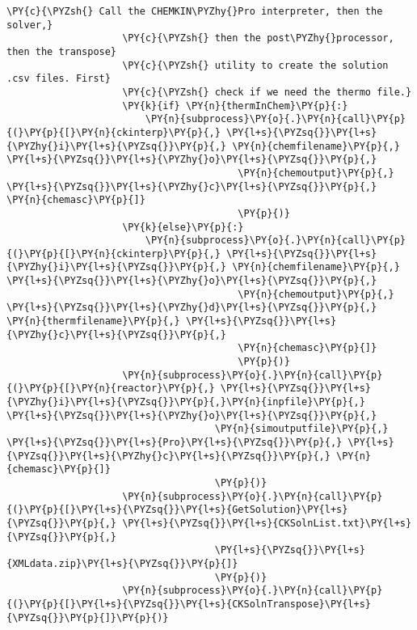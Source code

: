 \begin{Verbatim}[commandchars=\\\{\}]
                    \PY{c}{\PYZsh{} Call the CHEMKIN\PYZhy{}Pro interpreter, then the solver,}
                    \PY{c}{\PYZsh{} then the post\PYZhy{}processor, then the transpose}
                    \PY{c}{\PYZsh{} utility to create the solution .csv files. First}
                    \PY{c}{\PYZsh{} check if we need the thermo file.}
                    \PY{k}{if} \PY{n}{thermInChem}\PY{p}{:}
                        \PY{n}{subprocess}\PY{o}{.}\PY{n}{call}\PY{p}{(}\PY{p}{[}\PY{n}{ckinterp}\PY{p}{,} \PY{l+s}{\PYZsq{}}\PY{l+s}{\PYZhy{}i}\PY{l+s}{\PYZsq{}}\PY{p}{,} \PY{n}{chemfilename}\PY{p}{,} \PY{l+s}{\PYZsq{}}\PY{l+s}{\PYZhy{}o}\PY{l+s}{\PYZsq{}}\PY{p}{,}
                                        \PY{n}{chemoutput}\PY{p}{,} \PY{l+s}{\PYZsq{}}\PY{l+s}{\PYZhy{}c}\PY{l+s}{\PYZsq{}}\PY{p}{,} \PY{n}{chemasc}\PY{p}{]}
                                        \PY{p}{)}
                    \PY{k}{else}\PY{p}{:}
                        \PY{n}{subprocess}\PY{o}{.}\PY{n}{call}\PY{p}{(}\PY{p}{[}\PY{n}{ckinterp}\PY{p}{,} \PY{l+s}{\PYZsq{}}\PY{l+s}{\PYZhy{}i}\PY{l+s}{\PYZsq{}}\PY{p}{,} \PY{n}{chemfilename}\PY{p}{,} \PY{l+s}{\PYZsq{}}\PY{l+s}{\PYZhy{}o}\PY{l+s}{\PYZsq{}}\PY{p}{,}
                                        \PY{n}{chemoutput}\PY{p}{,} \PY{l+s}{\PYZsq{}}\PY{l+s}{\PYZhy{}d}\PY{l+s}{\PYZsq{}}\PY{p}{,} \PY{n}{thermfilename}\PY{p}{,} \PY{l+s}{\PYZsq{}}\PY{l+s}{\PYZhy{}c}\PY{l+s}{\PYZsq{}}\PY{p}{,}
                                        \PY{n}{chemasc}\PY{p}{]}
                                        \PY{p}{)}
                    \PY{n}{subprocess}\PY{o}{.}\PY{n}{call}\PY{p}{(}\PY{p}{[}\PY{n}{reactor}\PY{p}{,} \PY{l+s}{\PYZsq{}}\PY{l+s}{\PYZhy{}i}\PY{l+s}{\PYZsq{}}\PY{p}{,}\PY{n}{inpfile}\PY{p}{,} \PY{l+s}{\PYZsq{}}\PY{l+s}{\PYZhy{}o}\PY{l+s}{\PYZsq{}}\PY{p}{,}
                                    \PY{n}{simoutputfile}\PY{p}{,} \PY{l+s}{\PYZsq{}}\PY{l+s}{Pro}\PY{l+s}{\PYZsq{}}\PY{p}{,} \PY{l+s}{\PYZsq{}}\PY{l+s}{\PYZhy{}c}\PY{l+s}{\PYZsq{}}\PY{p}{,} \PY{n}{chemasc}\PY{p}{]}
                                    \PY{p}{)}
                    \PY{n}{subprocess}\PY{o}{.}\PY{n}{call}\PY{p}{(}\PY{p}{[}\PY{l+s}{\PYZsq{}}\PY{l+s}{GetSolution}\PY{l+s}{\PYZsq{}}\PY{p}{,} \PY{l+s}{\PYZsq{}}\PY{l+s}{CKSolnList.txt}\PY{l+s}{\PYZsq{}}\PY{p}{,}
                                    \PY{l+s}{\PYZsq{}}\PY{l+s}{XMLdata.zip}\PY{l+s}{\PYZsq{}}\PY{p}{]}
                                    \PY{p}{)}
                    \PY{n}{subprocess}\PY{o}{.}\PY{n}{call}\PY{p}{(}\PY{p}{[}\PY{l+s}{\PYZsq{}}\PY{l+s}{CKSolnTranspose}\PY{l+s}{\PYZsq{}}\PY{p}{]}\PY{p}{)}


\end{Verbatim}
